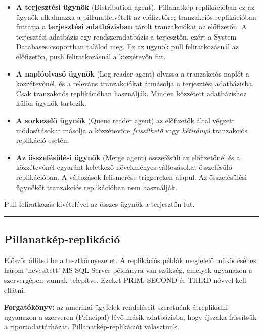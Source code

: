 \documentclass[
  magyar,
]{article}
\begin{document}
\begin{itemize}
\item
  \textbf{A terjesztési ügynök} (Distribution agent).
  Pillanatkép-replikációban ez az ügynök alkalmazza a pillanatfelvételt
  az előfizetőre; tranzakciós replikációban futtatja a
  \textbf{terjesztési adatbázisban} tárolt tranzakciókat az előfizetőn.
  A terjesztési adatbázis egy rendszeradatbázis a terjesztőn, ezért a
  System Databases csoportban találod meg. Ez az ügynök pull
  feliratkozásnál az előfizetőn, push feliratkozásnál a közzétevőn fut.
\item
  \textbf{A naplóolvasó ügynök} (Log reader agent) olvassa a tranzakciós
  naplót a közzétevőnél, és a releváns tranzakciókat átmásolja a
  terjesztési adatbázisba. Csak tranzakciós replikációban használják.
  Minden közzétett adatbázishoz külön ügynök tartozik.
\item
  \textbf{A sorkezelő ügynök} (Queue reader agent) az előfizetők által
  végzett módosításokat másolja a közzétevőre \emph{frissíthető} vagy
  \emph{kétirányú} tranzakciós replikáció esetén.
\item
  \textbf{Az összefésülési ügynök} (Merge agent) összefésüli az
  előfizetőnél és a közzétevőnél egyaránt keletkező növekményes
  változásokat összefésülő replikációban. A változások felismerése
  triggereken alapul. Az összefésülési ügynököt tranzakciós
  replikációban nem használják.
\end{itemize}

Pull feliratkozás kivételével az összes ügynök a terjesztőn fut.

\begin{center}\rule{0.5\linewidth}{0.5pt}\end{center}

\subsection{Pillanatkép-replikáció}\label{pillanatkuxe9p-replikuxe1ciuxf3}

Először állítsd be a tesztkörnyezetet. A replikációs példák megfelelő
működéséhez három `nevesített' MS SQL Server példányra van szükség,
amelyek ugyanazon a szervergépen vannak telepítve. Ezeket PRIM, SECOND
és THIRD névvel kell ellátni.

\textbf{Forgatókönyv:} az amerikai ügyfelek rendeléseit szeretnénk
átreplikálni ugyanazon a szerveren (Principal) lévő másik adatbázisba,
hogy éjszaka frissítsük a riportadattárházat. Pillanatkép-replikációt
választunk.
\end{document}

